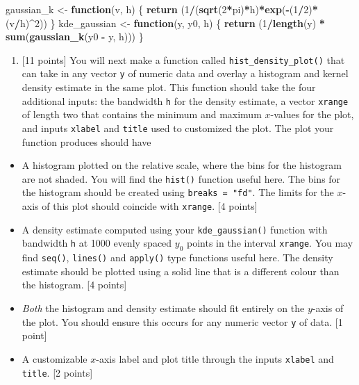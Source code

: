 \documentclass[
]{article}
\newenvironment{Shaded}{\begin{snugshade}}{\end{snugshade}}
\newcommand{\ControlFlowTok}[1]{\textcolor[rgb]{0.13,0.29,0.53}{\textbf{#1}}}
\newcommand{\DecValTok}[1]{\textcolor[rgb]{0.00,0.00,0.81}{#1}}
\newcommand{\FunctionTok}[1]{\textcolor[rgb]{0.13,0.29,0.53}{\textbf{#1}}}
\newcommand{\NormalTok}[1]{#1}
\newcommand{\OtherTok}[1]{\textcolor[rgb]{0.56,0.35,0.01}{#1}}
\newcommand{\SpecialCharTok}[1]{\textcolor[rgb]{0.81,0.36,0.00}{\textbf{#1}}}
\providecommand{\tightlist}{%
  \setlength{\itemsep}{0pt}\setlength{\parskip}{0pt}}
\begin{document}
\begin{Shaded}
\begin{Highlighting}[]
\NormalTok{gaussian\_k }\OtherTok{\textless{}{-}} \ControlFlowTok{function}\NormalTok{(v, h) \{}
  \FunctionTok{return}\NormalTok{ (}\DecValTok{1}\SpecialCharTok{/}\NormalTok{(}\FunctionTok{sqrt}\NormalTok{(}\DecValTok{2}\SpecialCharTok{*}\NormalTok{pi)}\SpecialCharTok{*}\NormalTok{h)}\SpecialCharTok{*}\FunctionTok{exp}\NormalTok{(}\SpecialCharTok{{-}}\NormalTok{(}\DecValTok{1}\SpecialCharTok{/}\DecValTok{2}\NormalTok{)}\SpecialCharTok{*}\NormalTok{(v}\SpecialCharTok{/}\NormalTok{h)}\SpecialCharTok{\^{}}\DecValTok{2}\NormalTok{))}
\NormalTok{\}}
\NormalTok{kde\_gaussian }\OtherTok{\textless{}{-}} \ControlFlowTok{function}\NormalTok{(y, y0, h) \{}
  \FunctionTok{return}\NormalTok{ (}\DecValTok{1}\SpecialCharTok{/}\FunctionTok{length}\NormalTok{(y) }\SpecialCharTok{*} \FunctionTok{sum}\NormalTok{(}\FunctionTok{gaussian\_k}\NormalTok{(y0 }\SpecialCharTok{{-}}\NormalTok{ y, h)))}
\NormalTok{\}}
\end{Highlighting}
\end{Shaded}

\begin{enumerate}
\def\labelenumi{(\alph{enumi})}
\setcounter{enumi}{1}
\tightlist
\item
  {[}11 points{]} You will next make a function called
  \texttt{hist\_density\_plot()} that can take in any vector \texttt{y}
  of numeric data and overlay a histogram and kernel density estimate in
  the same plot. This function should take the four additional inputs:
  the bandwidth \texttt{h} for the density estimate, a vector
  \texttt{xrange} of length two that contains the minimum and maximum
  \(x\)-values for the plot, and inputs \texttt{xlabel} and
  \texttt{title} used to customized the plot. The plot your function
  produces should have
\end{enumerate}

\begin{itemize}
\item
  A histogram plotted on the relative scale, where the bins for the
  histogram are not shaded. You will find the \texttt{hist()} function
  useful here. The bins for the histogram should be created using
  \texttt{breaks\ =\ "fd"}. The limits for the \(x\)-axis of this plot
  should coincide with \texttt{xrange}. {[}4 points{]}
\item
  A density estimate computed using your \texttt{kde\_gaussian()}
  function with bandwidth \texttt{h} at 1000 evenly spaced \(y_0\)
  points in the interval \texttt{xrange}. You may find \texttt{seq()},
  \texttt{lines()} and \texttt{apply()} type functions useful here. The
  density estimate should be plotted using a solid line that is a
  different colour than the histogram. {[}4 points{]}
\item
  \emph{Both} the histogram and density estimate should fit entirely on
  the \(y\)-axis of the plot. You should ensure this occurs for any
  numeric vector \texttt{y} of data. {[}1 point{]}
\item
  A customizable \(x\)-axis label and plot title through the inputs
  \texttt{xlabel} and \texttt{title}. {[}2 points{]}
\end{itemize}
\end{document}
